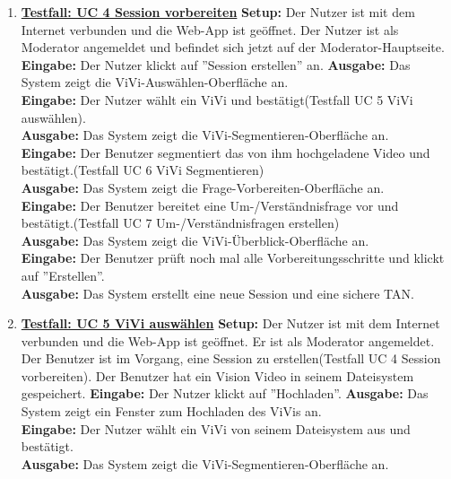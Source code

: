 \begin{enumerate}
	\item \underline{\textbf{Testfall: UC 4 Session vorbereiten}} \linebreak
	\textbf{Setup:} Der Nutzer ist mit dem Internet verbunden und die Web-App ist geöffnet. Der Nutzer ist als Moderator angemeldet und befindet sich jetzt auf der Moderator-Hauptseite.\linebreak
	\textbf{Eingabe:} Der Nutzer klickt auf ''Session erstellen'' an.\linebreak
	\textbf{Ausgabe:} Das System zeigt die ViVi-Auswählen-Oberfläche an. \\
	\textbf{Eingabe:} Der Nutzer wählt ein ViVi und bestätigt(Testfall UC 5 ViVi auswählen).\\
	\textbf{Ausgabe:} Das System zeigt die ViVi-Segmentieren-Oberfläche an. \\
	\textbf{Eingabe:} Der Benutzer segmentiert das von ihm hochgeladene Video und bestätigt.(Testfall UC 6 ViVi Segmentieren)\\
	\textbf{Ausgabe:} Das System zeigt die Frage-Vorbereiten-Oberfläche an.\\
	\textbf{Eingabe:} Der Benutzer bereitet eine Um-/Verständnisfrage vor und bestätigt.(Testfall UC 7 Um-/Verständnisfragen erstellen)\\
	\textbf{Ausgabe:} Das System zeigt die ViVi-Überblick-Oberfläche an.\\
	\textbf{Eingabe:} Der Benutzer prüft noch mal alle Vorbereitungsschritte und klickt auf ''Erstellen''.\\
	\textbf{Ausgabe:} Das System erstellt eine neue Session und eine sichere TAN.
	
	\item \underline{\textbf{Testfall: UC 5 ViVi auswählen}} \linebreak
	\textbf{Setup:} Der Nutzer ist mit dem Internet verbunden und die Web-App ist geöffnet. Er ist als Moderator angemeldet. Der Benutzer ist im Vorgang, eine Session zu erstellen(Testfall UC 4 Session vorbereiten). Der Benutzer hat ein Vision Video in seinem Dateisystem gespeichert. \linebreak
	\textbf{Eingabe:} Der Nutzer klickt auf ''Hochladen''. \linebreak
	\textbf{Ausgabe:} Das System zeigt ein Fenster zum Hochladen des ViVis an.\\
	\textbf{Eingabe:} Der Nutzer wählt ein ViVi von seinem Dateisystem aus und bestätigt.\\
	\textbf{Ausgabe:} Das System zeigt die ViVi-Segmentieren-Oberfläche an.
	

\end{enumerate}
